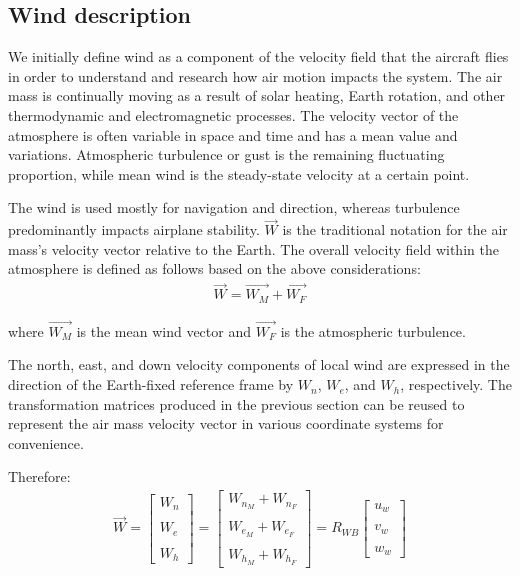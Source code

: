 \documentclass[twocolumn,showpacs,
    nofootinbib,aps,superscriptaddress,
    eqsecnum,prd,showkeys,10pt,floatfix]{revtex4}
\begin{document}
\subsection{Wind description}
We initially define wind as a component of the velocity field that the aircraft
flies in order to understand and research how air motion impacts the system.
The air mass is continually moving as a result of solar heating, Earth
rotation, and other thermodynamic and electromagnetic processes. The velocity
vector of the atmosphere is often variable in space and time and has a mean
value and variations. Atmospheric turbulence or gust is the remaining
fluctuating proportion, while mean wind is the steady-state velocity at a
certain point.
\par
The wind is used mostly for navigation and direction, whereas turbulence
predominantly impacts airplane stability. $\vec{W}$ is the traditional notation
for the air mass's velocity vector relative to the Earth. The overall velocity
field within the atmosphere is defined as follows based on the above
considerations:
\begin{align}
    \vec{W}=\vec{W_M}+\vec{W_F}
\end{align}
\par
where $\vec{W_M}$ is the mean wind vector and $\vec{W_F}$ is the atmospheric
turbulence.
\par
The north, east, and down velocity components of local wind are expressed in
the direction of the Earth-fixed reference frame by $W_n$, $W_e$, and $W_h$,
respectively. The transformation matrices produced in the previous section can
be reused to represent the air mass velocity vector in various coordinate
systems for convenience.
\par
Therefore:
\begin{align}
    \vec{W}=\begin{bmatrix}
                W_n \\\\
                W_e \\\\
                W_h
            \end{bmatrix}=
    \begin{bmatrix}
        W_{n_M}+W_{n_F} \\\\
        W_{e_M}+W_{e_F} \\\\
        W_{h_M}+W_{h_F}
    \end{bmatrix}
    =R_{WB}\begin{bmatrix}
               u_w \\\\
               v_w \\\\
               w_w
           \end{bmatrix}
\end{align}
\end{document}
